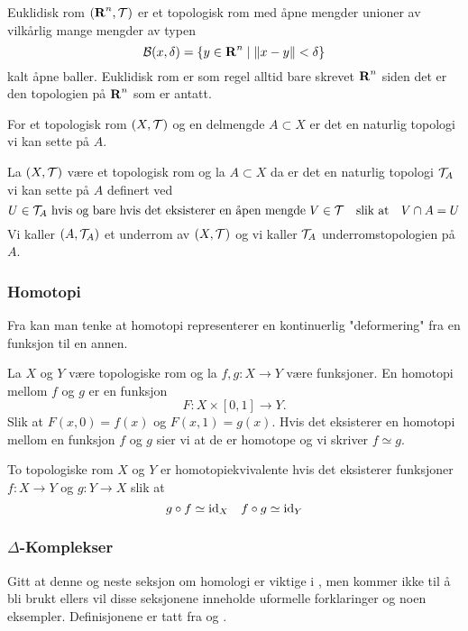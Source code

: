 \begin{eksempel}\label{Ex:EukTRom}
    Euklidisk rom $(\textnormal{\textbf{{R}}}^n,\mathcal{T})$ er et topologisk rom
    med åpne mengder unioner av vilkårlig mange mengder av
    typen
    \[\mathcal{B}(x,\delta) = \{y\in\textnormal{\textbf{{R}}}^n\;|\;
    \|x-y\|<\delta\}\]
    kalt åpne baller. Euklidisk rom er som regel alltid
    bare skrevet $\textnormal{\textbf{{R}}}^n$ siden det er den topologien på
    $\textnormal{\textbf{{R}}}^n$ som er antatt.
\end{eksempel}

For et topologisk rom $(X,\mathcal{T})$ og en delmengde
$A\subset X$ er det en naturlig topologi vi kan sette på
$A$.

\begin{definisjon}\label{Def:UnderTop}
    La $(X,\mathcal{T})$ være et topologisk rom og la $A\subset
    X$ da er det en naturlig topologi $\mathcal{T}_A$ vi kan
    sette på $A$ definert ved
    \[U\in\mathcal{T}_A \text{ hvis og bare hvis det eksisterer
    en åpen mengde } V\in\mathcal{T}\quad\text{slik at}\quad
    V\cap A = U\]
    Vi kaller $(A,\mathcal{T}_A)$ et underrom av $(X,\mathcal{T})$ og
    vi kaller $\mathcal{T}_A$ underromstopologien på $A$.
\end{definisjon}


\subsubsection{Homotopi}\label{sec:Homotopi}
Fra \citep[seksjon 51]{Munkres2013} kan man tenke at
homotopi representerer en kontinuerlig "deformering" fra en
funksjon til en annen.

\begin{definisjon}\label{Def:Homotopi}
    La $X$ og $Y$ være topologiske rom og la $f,g: X\to Y$
    være funksjoner. En homotopi mellom $f$ og $g$ er en
    funksjon
    \[F: X\times[0,1]\to Y.\]
    Slik at $F(x,0)=f(x)$ og $F(x,1)=g(x)$.
    Hvis det eksisterer en homotopi mellom en funksjon $f$
    og $g$ sier vi at de er homotope og vi skriver
    $f\simeq g$.
\end{definisjon} 

\begin{definisjon}\label{Def:HomotopiEkv}
    To topologiske rom $X$ og $Y$ er homotopiekvivalente
    hvis det eksisterer funksjoner $f: X\to Y$ og $g: Y\to
    X$ slik at
    \[g\circ f\simeq\textnormal{id}_X\quad f\circ g \simeq \textnormal{id}_Y\]
\end{definisjon}

\subsubsection{$\Delta$-Komplekser}\label{sek:SimpKomp}
Gitt at denne og neste seksjon om homologi er viktige
i , men kommer ikke til å bli
brukt ellers vil disse seksjonene inneholde uformelle
forklaringer og noen eksempler. Definisjonene er tatt fra
\citep[seksjon 1]{MunkresJamesR.2018EOAT} og
\citep[seksjon 2]{MunkresJamesR.2018EOAT}.


